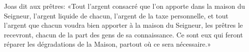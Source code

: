 Joas dit aux prêtres:
	«Tout l’argent consacré que l’on apporte dans la maison du Seigneur,
	l’argent liquide de chacun, l’argent de la taxe personnelle,
	et tout l’argent que chacun voudra bien apporter à la maison du Seigneur,
	les prêtres le recevront, chacun de la part des gens de sa connaissance.
Ce sont eux qui feront réparer les dégradations de la Maison,
	partout où ce sera nécessaire.»
